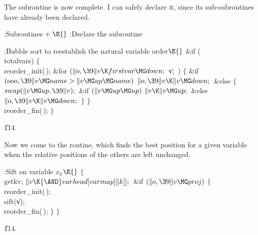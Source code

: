 The  subroutine is now complete. I can safely declare it,
since its sub-subroutines have already been declared.

\Y\B\4:Subroutines\X${}\mathrel+\E{}$\6
:Declare the  subroutine\X\par
\fi

\B{}:Bubble sort to reestablish the natural variable order\X${}\E{}$\6
\&{if} (\\{totalvars})\5
${}\{{}$\1\6
\\{reorder\_init}(\,);\6
\&{for} ${}(\|o,\39\|v\K\\{firstvar}\MG\\{down};{}$ \|v; \,)\5
${}\{{}$\1\6
\&{if} ${}(\\{ooo},\39\|v\MG\\{name}>\|v\MG\\{up}\MG\\{name}){}$\1\5
${}\|o,\39\|v\K\|v\MG\\{down};{}$\2\6
\&{else}\5
${}\{{}$\1\6
${}\\{swap}(\|v\MG\\{up},\39\|v);{}$\6
\&{if} ${}(\|v\MG\\{up}\MG\\{up}){}$\1\5
${}\|v\K\|v\MG\\{up};{}$\2\6
\&{else}\1\5
${}\|o,\39\|v\K\|v\MG\\{down};{}$\2\6
\4${}\}{}$\2\6
\4${}\}{}$\2\6
\\{reorder\_fin}(\,);\6
\4${}\}{}$\2\par
\U114.\fi

Now we come to the  routine, which finds the best position
for a given variable when the relative positions of the others
are left unchanged.

\Y\B\4:Sift on variable $x_k$\X${}\E{}$\6
${}\{{}$\1\6
\\{getkv};\5
${}\|v\K{\AND}\\{varhead}[\\{varmap}[\|k]];{}$\6
\&{if} ${}(\|o,\39\|v\MG\\{proj}){}$\5
${}\{{}$\1\6
\\{reorder\_init}(\,);\6
\\{sift}(\|v);\6
\\{reorder\_fin}(\,);\6
\4${}\}{}$\2\6
\4${}\}{}$\2\par
\U114.\fi

